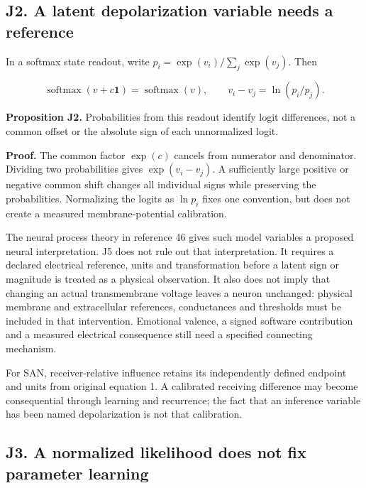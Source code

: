 \documentclass[
  american,
  11pt,
  letterpaper,
]{article}
\begin{document}
\subsection{J2. A latent depolarization variable needs a reference}\label{j2.-a-latent-depolarization-variable-needs-a-reference}

In a softmax state readout, write \(p_i=\exp(v_i)/\sum_j\exp(v_j)\). Then

\begin{equation}
\operatorname{softmax}(v+c\mathbf1)=\operatorname{softmax}(v),\qquad
v_i-v_j=\ln(p_i/p_j).
\tag{J5}
\end{equation}

\textbf{Proposition J2.} Probabilities from this readout identify logit differences, not a common offset or the absolute sign of each unnormalized logit.

\textbf{Proof.} The common factor \(\exp(c)\) cancels from numerator and denominator. Dividing two probabilities gives \(\exp(v_i-v_j)\). A sufficiently large positive or negative common shift changes all individual signs while preserving the probabilities. Normalizing the logits as \(\ln p_i\) fixes one convention, but does not create a measured membrane-potential calibration.

The neural process theory in reference 46 gives such model variables a proposed neural interpretation. J5 does not rule out that interpretation. It requires a declared electrical reference, units and transformation before a latent sign or magnitude is treated as a physical observation. It also does not imply that changing an actual transmembrane voltage leaves a neuron unchanged: physical membrane and extracellular references, conductances and thresholds must be included in that intervention. Emotional valence, a signed software contribution and a measured electrical consequence still need a specified connecting mechanism.

For SAN, receiver-relative influence retains its independently defined endpoint and units from original equation 1. A calibrated receiving difference may become consequential through learning and recurrence; the fact that an inference variable has been named depolarization is not that calibration.

\subsection{J3. A normalized likelihood does not fix parameter learning}\label{j3.-a-normalized-likelihood-does-not-fix-parameter-learning}
\end{document}

